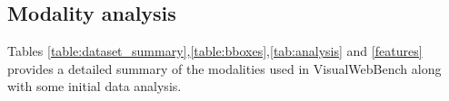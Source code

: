 \documentclass[11pt,a4paper]{article}
\begin{document}
\subsection{Modality analysis}
Tables \ref{table:dataset_summary},\ref{table:bboxes},\ref{tab:analysis} and \ref{features} provides a detailed summary of the modalities used in VisualWebBench along with some initial data analysis.
\begin{table}[h!]
\centering
{}
\caption{Number of datapoints in each task}
\label{table:dataset_summary}
\end{table}

\begin{table}[htbp]
\centering
{}
\caption{Task details with average number of objects detected per image}
\label{table:bboxes}
\end{table}
\end{document}
